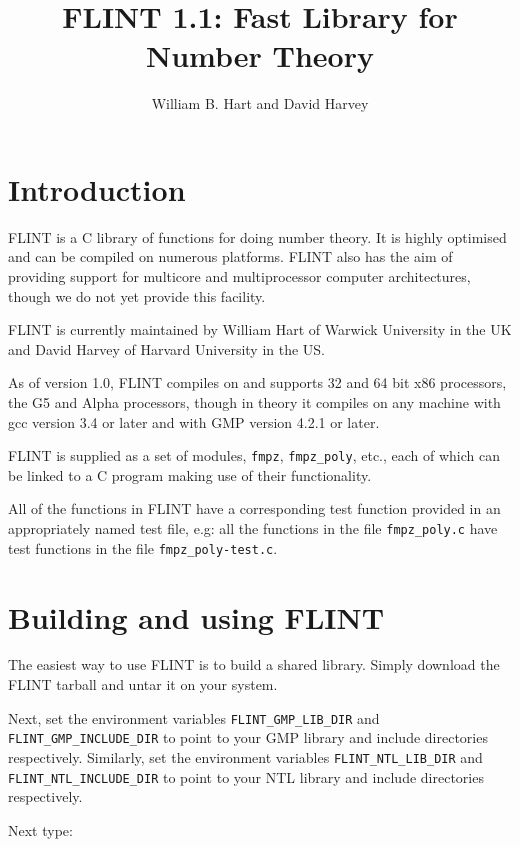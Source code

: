 \documentclass[a4paper,10pt]{article}
\title{FLINT 1.1: Fast Library for Number Theory}
\author{William B. Hart and David Harvey}
\newcommand{\code}{\lstinline}
\begin{document}
\maketitle
\lstset{language=c}
\lstset{basicstyle=\ttfamily}
\lstset{keywordstyle=}
\lstset{escapeinside=\%\%}

\section{Introduction}

FLINT is a C library of functions for doing number theory. It is highly optimised and can be compiled on numerous platforms. FLINT also has the aim of providing support for multicore and multiprocessor computer architectures, though we do not yet provide this facility.

FLINT is currently maintained by William Hart of Warwick University in the UK and David Harvey of Harvard University in the US.

As of version 1.0, FLINT compiles on and supports 32 and 64 bit x86 processors, the G5 and Alpha processors, though in theory it compiles on any machine with gcc version 3.4 or later and with GMP version 4.2.1 or later.

FLINT is supplied as a set of modules, \code{fmpz}, \code{fmpz_poly}, etc., each of which can be linked to a C program making use of their functionality. 

All of the functions in FLINT have a corresponding test function provided in an appropriately named test file, e.g: all the functions in the file \code{fmpz_poly.c} have test functions in the file \code{fmpz_poly-test.c}.

\section{Building and using FLINT}

The easiest way to use FLINT is to build a shared library. Simply download the FLINT tarball and untar it on your system.

Next, set the environment variables \code{FLINT_GMP_LIB_DIR} and \code{FLINT_GMP_INCLUDE_DIR} to point to your GMP library and include directories respectively. Similarly, set the environment variables \code{FLINT_NTL_LIB_DIR} and \code{FLINT_NTL_INCLUDE_DIR} to point to your NTL library and include directories respectively. 

Next type:
\end{document}
